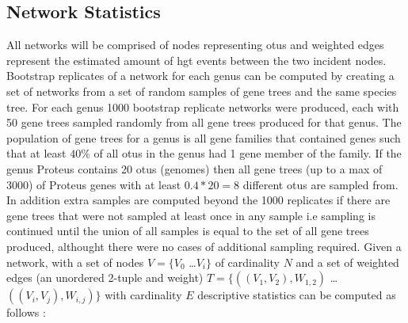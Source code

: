 \subsection{Network Statistics}
All networks will be comprised of nodes representing \ac{otu}s and weighted edges represent the estimated amount of \ac{hgt} events between the two incident nodes.
Bootstrap replicates of a network for each genus can be computed by creating a set of networks from a set of random samples of gene trees and the same species tree.
For each genus 1000 bootstrap replicate networks were produced, each with 50 gene trees sampled randomly from all gene trees produced for that genus.
The population of gene trees for a genus is all gene families that contained genes such that at least $40\%$ of all \ac{otu}s in the genus had 1 gene member of the family.
If the genus Proteus contains 20 \ac{otu}s (genomes) then all gene trees (up to a max of 3000) of Proteus genes with at least $0.4*20=8$ different \ac{otu}s are sampled from.
In addition extra samples are computed beyond the 1000 replicates if there are gene trees that were not sampled at least once in any sample i.e sampling is continued until the union of all samples is equal to the set of all gene trees produced, althought there were no cases of additional sampling required.
Given a network, with a set of nodes $V = \{V_0$ \dots $V_i\}$ of cardinality $N$ and a set of weighted edges (an unordered 2-tuple and weight) $T = \{((V_1,V_2),W_{1,2})$ \dots $((V_i,V_j),W_{i,j})\}$ with cardinality $E$ descriptive statistics can be computed as follows \citep{netstat}:
